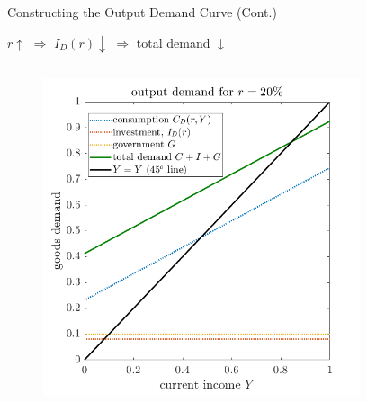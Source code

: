 \documentclass[11pt,aspectratio=43]{beamer}
\theoremstyle{definition}
\begin{document}
\begin{frame}{Constructing the Output Demand Curve (Cont.)}
\label{slide:Constructing_the_Output_Demand_Curve__Cont__}
    \begin{center}
        $ r \uparrow  $ $ \Rightarrow  $ $ I_{D}( r ) \downarrow  $ $ \Rightarrow  $ total demand $ \downarrow  $
    \end{center}

    \begin{columns}
        \begin{column}{0.55\textwidth}
            \begin{figure}
                \includegraphics[width=\textwidth]{./figures/OutputDemand.png}
            \end{figure}
        \end{column}
        \begin{column}{0.55\textwidth}
            \begin{figure}

\end{figure}
\end{column}
\end{columns}
\end{frame}
\end{document}
